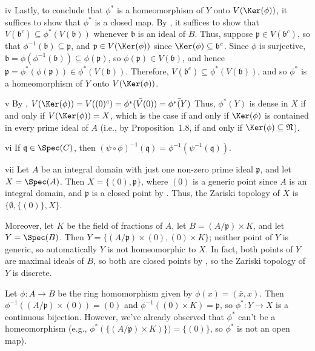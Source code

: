 \begin{partsolution}{iv}
Lastly, to conclude that \(\phi^*\) is a homeomorphism of \(Y\) onto \(V(\Ker(\phi))\), it suffices to show that \(\phi^*\) is a closed map.
By , it suffices to show that \(V(\mathfrak{b}^c) \subseteq \phi^*(V(\mathfrak{b}))\) whenever \(\mathfrak{b}\) is an ideal of \(B\).
Thus, suppose \(\mathfrak{p} \in V(\mathfrak{b}^c)\), so that \(\phi^{-1}(\mathfrak{b}) \subseteq \mathfrak{p}\), and \(\mathfrak{p} \in V(\Ker(\phi))\) since \(\Ker(\phi) \subseteq \mathfrak{b}^c\).
Since \(\phi\) is surjective, \(\mathfrak{b} = \phi(\phi^{-1}(\mathfrak{b})) \subseteq \phi(\mathfrak{p})\), so \(\phi(\mathfrak{p}) \in V(\mathfrak{b})\), and hence \(\mathfrak{p} = \phi^*(\phi(\mathfrak{p})) \in \phi^*(V(\mathfrak{b}))\).
Therefore, \(V(\mathfrak{b}^c) \subseteq \phi^*(V(\mathfrak{b}))\), and so \(\phi^*\) is a homeomorphism of \(Y\) onto \(V(\Ker(\phi))\).
\end{partsolution}

\begin{partsolution}{v}
By , \(V(\Ker(\phi)) = V((0)^c) = \bar{\phi^*(V(0))} = \bar{\phi^*(Y)}\)
Thus, \(\phi^*(Y)\) is dense in \(X\) if and only if \(V(\Ker(\phi)) = X\), which is the case if and only if \(\Ker(\phi)\) is contained in every prime ideal of \(A\) (i.e., by Proposition~1.8, if and only if \(\Ker(\phi) \subseteq \mathfrak{N}\)).
\end{partsolution}

\begin{partsolution}{vi}
If \(\mathfrak{q} \in \Spec(C)\), then \((\psi \circ \phi)^{-1}(\mathfrak{q}) = \phi^{-1}(\psi^{-1}(\mathfrak{q}))\).
\end{partsolution}

\begin{partsolution}{vii}
Let \(A\) be an integral domain with just one non-zero prime ideal \(\mathfrak{p}\), and let \(X = \Spec(A)\).
Then \(X = \{(0), \mathfrak{p}\}\), where \((0)\) is a generic point since \(A\) is an integral domain, and \(\mathfrak{p}\) is a closed point by .
Thus, the Zariski topology of \(X\) is \(\{\emptyset, \{(0)\}, X\}\).

Moreover, let \(K\) be the field of fractions of \(A\), let \(B = (A / \mathfrak{p}) \times K\), and let \(Y = \Spec(B)\).
Then \(Y = \{(A / \mathfrak{p}) \times (0), (0) \times K\}\); neither point of \(Y\) is generic, so automatically \(Y\) is not homeomorphic to \(X\).
In fact, both points of \(Y\) are maximal ideals of \(B\), so both are closed points by , so the Zariski topology of \(Y\) is discrete.

Let \(\phi : A \to B\) be the ring homomorphism given by \(\phi(x) = (\bar{x}, x)\).
Then \(\phi^{-1}((A / \mathfrak{p}) \times (0)) = (0)\) and \(\phi^{-1}((0) \times K) = \mathfrak{p}\), so \(\phi^* : Y \to X\) is a continuous bijection.
However, we've already observed that \(\phi^*\) can't be a homeomorphism (e.g., \(\phi^*(\{(A / \mathfrak{p}) \times K)\}) = \{(0)\}\), so \(\phi^*\) is not an open map).
\end{partsolution}